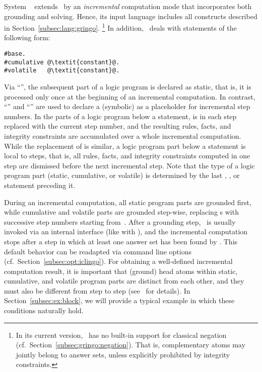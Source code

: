 System \iclingo~\cite{gekakaosscth08a} extends \clingo\ by an
\emph{incremental} computation mode that incorporates both grounding and solving.
Hence, its input language includes all constructs described
in Section~\ref{subsec:lang:gringo}.%
\footnote{%
  In its current version, \iclingo\ has no built-in support for
  classical negation (cf.\ Section~\ref{subsec:gringo:negation}).
  That is, complementary atoms may jointly belong to answer sets,
  unless explicitly prohibited by integrity constraints.}
In addition, \iclingo\ deals with statements of the following form:
%
\begin{lstlisting}[numbers=none,escapechar=@]
#base.
#cumulative @\textit{constant}@.
#volatile   @\textit{constant}@.
\end{lstlisting}
%
Via ``'',
the subsequent part of a logic program is declared as static, that is,
it is processed only once at the beginning of an incremental computation.
In contrast, ``''
and ``'' are used to declare
a (symbolic)  as a placeholder for incremental step numbers.
In the parts of a logic program below a  statement,
 is in each step replaced with the current step number,
and the resulting rules, facts, and integrity constraints are accumulated
over a whole incremental computation.
While the replacement of  is similar,
a logic program part below a  statement is local to steps,
that is, all rules, facts, and integrity constraints computed in one step
are dismissed before the next incremental step.
Note that the type of a logic program part (static, cumulative, or volatile)
is determined by the last
, , or  statement
preceding it.

During an incremental computation, all static program parts are grounded first,
while cumulative and volatile parts are grounded step-wise,
replacing s with successive step numbers starting from~.
After a grounding step, \clasp\ is usually invoked via an internal interface
(like with \clingo), and the incremental computation stops after a step
in which at least one answer set has been found by \clasp.
This default behavior can be readapted via command line 
options (cf.\ Section~\ref{subsec:opt:iclingo}).
For obtaining a well-defined incremental computation result,
it is important that (ground) head atoms within static, cumulative, and volatile program parts
are distinct from each other, and they must also be different from step to step
(see~\cite{gekakaosscth08a} for details).
In Section~\ref{subsec:ex:block},
we will provide a typical example in which these conditions naturally hold.


